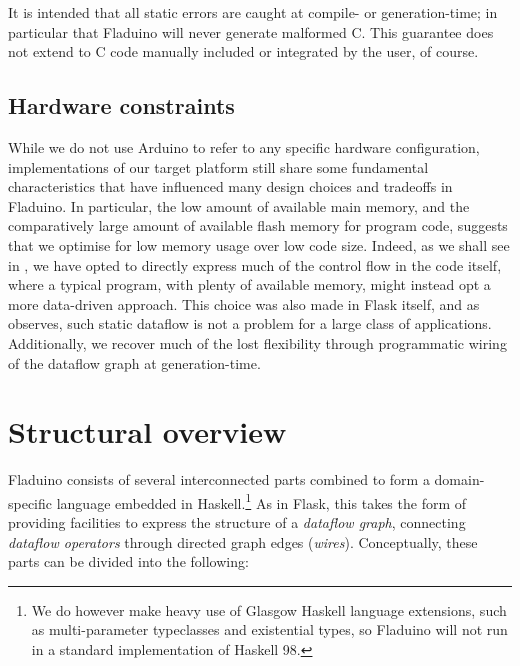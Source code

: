 \documentclass[a4paper, oneside, final]{memoir}
\let\fref\undefined
\begin{document}
It is intended that all static errors are caught at compile- or
generation-time; in particular that Fladuino will never generate
malformed C.  This guarantee does not extend to C code manually
included or integrated by the user, of course.

\subsection{Hardware constraints}

While we do not use Arduino to refer to any specific hardware
configuration, implementations of our target platform still share some
fundamental characteristics that have influenced many design choices
and tradeoffs in Fladuino.  In particular, the low amount of available
main memory, and the comparatively large amount of available flash
memory for program code, suggests that we optimise for low memory
usage over low code size.  Indeed, as we shall see in
\fref{sec:dataflowtranslation}, we have opted to directly express much of
the control flow in the code itself, where a typical program, with
plenty of available memory, might instead opt a more data-driven
approach.  This choice was also made in Flask itself, and as
\cite{flask08} observes, such static dataflow is not a problem for a
large class of applications.  Additionally, we recover much of the
lost flexibility through programmatic wiring of the dataflow graph at
generation-time.

\section{Structural overview}

Fladuino consists of several interconnected parts combined to form a
domain-specific language embedded in Haskell.\footnote{We do however
  make heavy use of Glasgow Haskell language extensions, such as
  multi-parameter typeclasses and existential types, so Fladuino will
  not run in a standard implementation of Haskell 98.}  As in Flask,
this takes the form of providing facilities to express the structure
of a \textit{dataflow graph}, connecting \textit{dataflow operators}
through directed graph edges (\textit{wires}).  Conceptually, these
parts can be divided into the following:
\end{document}
